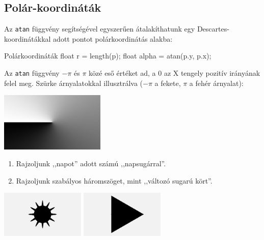 \subsection{Polár-koordináták}

Az \texttt{atan} függvény segítségével egyszerűen átalakíthatunk egy Descartes-koordinátákkal adott
pontot polárkoordinátás alakba:

\begin{glsl}{Polárkoordináták}
float r = length(p);
float alpha = atan(p.y, p.x);
\end{glsl}

Az \texttt{atan} függvény $-\pi$ és $\pi$ közé eső értéket ad, a 0 az X tengely pozitív irányának felel meg.
Szürke árnyalatokkal illusztrálva ($-\pi$ a fekete, $\pi$ a fehér árnyalat):

\begin{center}
  \includegraphics[width=5cm]{images/atan.png}  
\end{center}

\progfeladatok

\begin{enumerate}[resume]
  \item Rajzoljunk ,,napot'' adott számú ,,napsugárral''.
  \item Rajzoljunk szabályos háromszöget, mint ,,változó sugarú kört''.
\end{enumerate}

\begin{center}
  \hfill
  \includegraphics[width=4cm]{images/f13.png}\hfill
  \includegraphics[width=4cm]{images/f14.png}\hfill~
\end{center}

